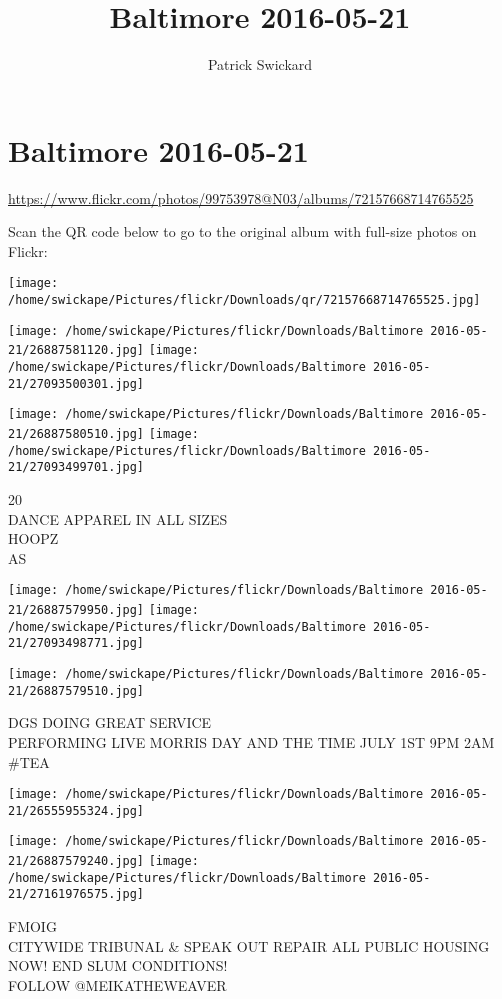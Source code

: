 \documentclass[10pt,letterpaper]{article}
\title{Baltimore 2016-05-21}
\author{Patrick Swickard}
\date{}
\begin{document}
\section*{Baltimore 2016-05-21}

\url{https://www.flickr.com/photos/99753978@N03/albums/72157668714765525}

Scan the QR code below to go to the original album with full-size photos on Flickr:

\texttt{[image: /home/swickape/Pictures/flickr/Downloads/qr/72157668714765525.jpg]}
\pagebreak

\texttt{[image: /home/swickape/Pictures/flickr/Downloads/Baltimore 2016-05-21/26887581120.jpg]}
\texttt{[image: /home/swickape/Pictures/flickr/Downloads/Baltimore 2016-05-21/27093500301.jpg]}

\texttt{[image: /home/swickape/Pictures/flickr/Downloads/Baltimore 2016-05-21/26887580510.jpg]}
\texttt{[image: /home/swickape/Pictures/flickr/Downloads/Baltimore 2016-05-21/27093499701.jpg]}

20\\
DANCE APPAREL IN ALL SIZES\\
HOOPZ\\
AS
\pagebreak

\texttt{[image: /home/swickape/Pictures/flickr/Downloads/Baltimore 2016-05-21/26887579950.jpg]}
\texttt{[image: /home/swickape/Pictures/flickr/Downloads/Baltimore 2016-05-21/27093498771.jpg]}

\vspace{0.25in}
\texttt{[image: /home/swickape/Pictures/flickr/Downloads/Baltimore 2016-05-21/26887579510.jpg]}

DGS DOING GREAT SERVICE\\
PERFORMING LIVE MORRIS DAY AND THE TIME JULY 1ST 9PM 2AM\\
\#TEA
\pagebreak

\texttt{[image: /home/swickape/Pictures/flickr/Downloads/Baltimore 2016-05-21/26555955324.jpg]}

\vspace{0.25in}
\texttt{[image: /home/swickape/Pictures/flickr/Downloads/Baltimore 2016-05-21/26887579240.jpg]}
\texttt{[image: /home/swickape/Pictures/flickr/Downloads/Baltimore 2016-05-21/27161976575.jpg]}

FMOIG\\
CITYWIDE TRIBUNAL \& SPEAK OUT REPAIR ALL PUBLIC HOUSING NOW!  END SLUM CONDITIONS!\\
FOLLOW @MEIKATHEWEAVER
\pagebreak
\end{document}
